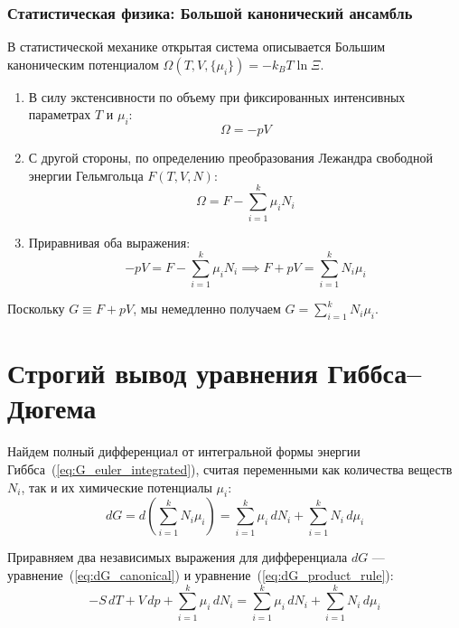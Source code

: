 \documentclass[12pt,a4paper]{article}
\begin{document}
\subsubsection[Статистическая физика]{Статистическая физика: Большой канонический ансамбль}
В статистической механике открытая система описывается Большим каноническим потенциалом $\Omega(T, V, \{\mu_i\}) = -k_B T \ln \Xi$. 
\begin{enumerate}
    \item В силу экстенсивности по объему при фиксированных интенсивных параметрах $T$ и $\mu_i$:
    \begin{equation}
        \Omega = -p V
    \end{equation}
    \item С другой стороны, по определению преобразования Лежандра свободной энергии Гельмгольца $F(T, V, N)$:
    \begin{equation}
        \Omega = F - \sum_{i=1}^k \mu_i N_i
    \end{equation}
    \item Приравнивая оба выражения:
    \begin{equation}
        -pV = F - \sum_{i=1}^k \mu_i N_i \implies F + pV = \sum_{i=1}^k N_i \mu_i
    \end{equation}
\end{enumerate}
Поскольку $G \equiv F + pV$, мы немедленно получаем $G = \sum_{i=1}^k N_i \mu_i$.


\section{Строгий вывод уравнения Гиббса--Дюгема}

Найдем полный дифференциал от интегральной формы энергии Гиббса~(\ref{eq:G_euler_integrated}), считая переменными как количества веществ $N_i$, так и их химические потенциалы $\mu_i$:
\begin{equation}
    dG = d\left(\sum_{i=1}^k N_i \mu_i\right) = \sum_{i=1}^k \mu_i\,dN_i + \sum_{i=1}^k N_i\,d\mu_i
    \label{eq:dG_product_rule}
\end{equation}

Приравняем два независимых выражения для дифференциала $dG$ — уравнение~(\ref{eq:dG_canonical}) и уравнение~(\ref{eq:dG_product_rule}):
\begin{equation}
    -S\,dT + V\,dp + \sum_{i=1}^k \mu_i\,dN_i = \sum_{i=1}^k \mu_i\,dN_i + \sum_{i=1}^k N_i\,d\mu_i
\end{equation}
\end{document}
